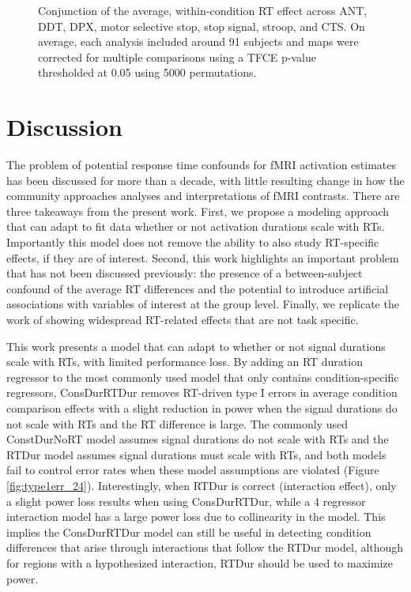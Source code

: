 \documentclass[sn-mathphys,Numbered, super, referee, lineno]{sn-jnl}
\begin{document}
\begin{figure}[ht!]
  \centering
   \caption{Conjunction of the average, within-condition RT effect across ANT, DDT, DPX, motor selective stop, stop signal, stroop, and CTS.  On average, each analysis included around 91 subjects and maps were corrected for multiple comparisons using a TFCE p-value thresholded at 0.05 using 5000 permutations.}
  \label{fig:conj}
\end{figure}




\section*{Discussion}

The problem of potential response time confounds for fMRI activation estimates has been discussed for more than a decade, with little resulting change in how the community approaches analyses and interpretations of fMRI contrasts.  There are three takeaways from the present work.  First, we propose a modeling approach that can adapt to fit data whether or not activation durations scale with RTs.  Importantly this model does not remove the ability to also study RT-specific effects, if they are of interest.  Second, this work highlights an important problem that has not been discussed previously: 
the presence of a between-subject confound of the average RT differences and the potential to introduce artificial associations with variables of interest at the group level.  Finally, we replicate the work of \citet{yarkoni_bold_2009} showing widespread RT-related effects that are not task specific.

This work presents a model that can adapt to whether or not signal durations scale with RTs, with limited performance loss. By adding an RT duration regressor to the most commonly used model that only contains condition-specific regressors, ConsDurRTDur removes RT-driven type I errors in average condition comparison effects with a slight reduction in power when the signal durations do not scale with RTs and the RT difference is large.  The commonly used ConstDurNoRT model assumes signal durations do not scale with RTs and the RTDur model assumes  signal durations must scale with RTs, and both models fail to control error rates when these model assumptions are violated (Figure \ref{fig:type1err_24}).  Interestingly, when RTDur is correct (interaction effect), only a slight power loss results when using ConsDurRTDur, while a 4 regressor interaction model has a large power loss due to collinearity in the  model. This implies the ConsDurRTDur model can still be useful in detecting condition differences that arise through interactions that follow the RTDur model, although for regions with a hypothesized interaction, RTDur should be used to maximize power.    
\end{document}
